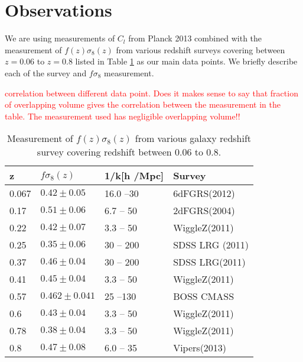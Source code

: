 \section{Observations} 
\label{sec:data} 


We are using measurements of $C_l$ from Planck 2013 \citep{planckI}combined with the measurement of $f(z)\sigma_8(z)$ from various redshift surveys covering between $z=0.06$ to $z=0.8$ listed in Table \ref{tbl:fs8} as our main data points. We briefly describe each of the survey and $f\sigma_8$ measurement.

\textcolor{red}{correlation between different data point. Does it makes sense to say that fraction of overlapping volume gives the correlation between the measurement in the table. The measurement used has negligible overlapping volume!!}

\begin{table}
\begin{center}
\caption{Measurement of $f(z)\sigma_8(z)$ from various galaxy redshift survey covering redshift between 0.06 to 0.8.}
\label{tbl:fs8}
\begin{tabular}{llll}
\hline
z              & $f\sigma_8(z)$ & 1/k[h /Mpc] & Survey  \\
\hline
\hline
0.067   & $0.42 \pm 0.05$     & 16.0 --30   & 6dFGRS(2012) \\
0.17     & $0.51 \pm 0.06$     &  6.7  -- 50  & 2dFGRS(2004)\\
0.22     & $0.42 \pm 0.07$     &  3.3  -- 50  & WiggleZ(2011) \\
0.25     & $0.35 \pm 0.06$     &  30 -- 200  & SDSS LRG (2011) \\
0.37     & $0.46 \pm 0.04$     &  30 -- 200  & SDSS LRG(2011)\\
0.41     & $0.45 \pm 0.04$     &  3.3 -- 50   & WiggleZ(2011)\\
0.57     & $0.462 \pm 0.041$     &  25 --130   & BOSS CMASS\\
0.6       & $0.43 \pm 0.04$     &  3.3 -- 50   & WiggleZ(2011) \\
0.78     & $0.38 \pm 0.04$     &  3.3 -- 50   & WiggleZ(2011)\\
0.8       & $0.47 \pm 0.08$     &  6.0 -- 35   & Vipers(2013) \\
\end{tabular}
\end{center}
\end{table}

